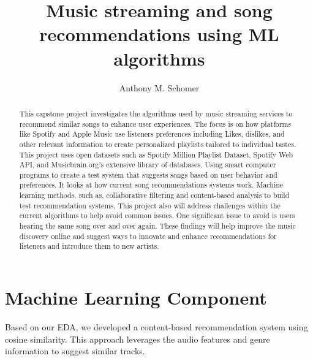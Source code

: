 \documentclass[runningheads]{llncs}
\begin{document}
%
\title{Music streaming and song recommendations using ML algorithms}
%
%
\author{Anthony M. Schomer}
%
%
%
\maketitle              %
%
\begin{abstract}
This capstone project investigates the algorithms used by music streaming services to recommend similar songs to enhance user experiences. The focus is on how platforms like Spotify and Apple Music use listeners preferences including Likes, dislikes, and other relevant information to create personalized playlists tailored to individual tastes. This project uses open datasets such as Spotify Million Playlist Dataset, Spotify Web API, and Musicbrain.org's extensive library of databases. Using smart computer programs to create a test system that suggests songs based on user behavior and preferences. It looks at how current song recommendations systems work. Machine learning methods. such as, collaborative filtering and content-based analysis to build test recommendation systems. This project also will address challenges within the current algorithms to help avoid common issues. One significant issue to avoid is users hearing the same song over and over again. These findings will help improve the music discovery online and suggest ways to innovate and enhance recommendations for listeners and introduce them to new artists. 

\end{abstract}


\section{Machine Learning Component}

Based on our EDA, we developed a content-based recommendation system using cosine similarity. This approach leverages the audio features and genre information to suggest similar tracks.
\end{document}
